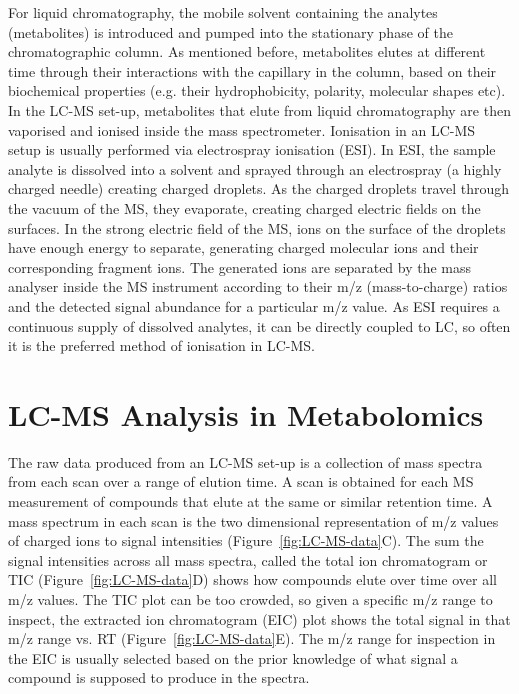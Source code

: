 For liquid chromatography, the mobile solvent containing the analytes (metabolites) is introduced and pumped into the stationary phase of the chromatographic column. As mentioned before, metabolites elutes at different time through their interactions with the capillary in the column, based on their biochemical properties (e.g. their hydrophobicity, polarity, molecular shapes etc). In the LC-MS set-up, metabolites that elute from liquid chromatography are then vaporised and ionised inside the mass spectrometer. Ionisation in an LC-MS setup is usually performed via electrospray ionisation (ESI). In ESI, the sample analyte is dissolved into a solvent and sprayed through an electrospray (a highly charged needle) creating charged droplets. As the charged droplets travel through the vacuum of the MS, they evaporate, creating charged electric fields on the surfaces. In the strong electric field of the MS, ions on the surface of the droplets have enough energy to separate, generating charged molecular ions and their corresponding fragment ions. The generated ions are separated by the mass analyser inside the MS instrument according to their m/z (mass-to-charge) ratios and the detected signal abundance for a particular m/z value. As ESI requires a continuous supply of dissolved analytes, it can be directly coupled to LC, so often it is the preferred method of ionisation in LC-MS. 

\section{LC-MS Analysis in Metabolomics}

The raw data produced from an LC-MS set-up is a collection of mass spectra from each scan over a range of elution time. A scan is obtained for each MS measurement of compounds that elute at the same or similar retention time. A mass spectrum in each scan is the two dimensional representation of m/z values of charged ions to signal intensities (Figure~\ref{fig:LC-MS-data}C). The sum the signal intensities across all mass spectra, called the total ion chromatogram or TIC (Figure~\ref{fig:LC-MS-data}D) shows how compounds elute over time over all m/z values. The TIC plot can be too crowded, so given a specific m/z range to inspect, the extracted ion chromatogram (EIC) plot shows the total signal in that m/z range vs. RT (Figure~\ref{fig:LC-MS-data}E). The m/z range for inspection in the EIC is usually selected based on the prior knowledge of what signal a compound is supposed to produce in the spectra.

